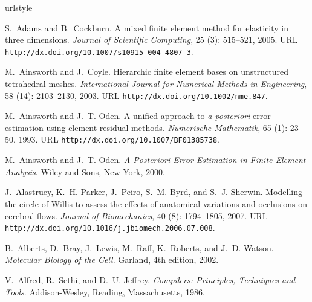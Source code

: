 \begin{thebibliography}{467}
\providecommand{\natexlab}[1]{#1}
\providecommand{\url}[1]{\texttt{#1}}
\expandafter\ifx\csname urlstyle\endcsname\relax
  \providecommand{\doi}[1]{doi: #1}\else
  \providecommand{\doi}{doi: \begingroup \urlstyle{rm}\Url}\fi

S.~Adams and B.~Cockburn.
\newblock A mixed finite element method for elasticity in three dimensions.
\newblock \emph{Journal of Scientific Computing}, 25 (3):
  515--521, 2005.
\newblock URL \url{http://dx.doi.org/10.1007/s10915-004-4807-3}.

M.~Ainsworth and J.~Coyle.
\newblock Hierarchic finite element bases on unstructured tetrahedral meshes.
\newblock \emph{International Journal for Numerical Methods in Engineering},
  58 (14): 2103--2130, 2003.
\newblock URL \url{http://dx.doi.org/10.1002/nme.847}.

M.~Ainsworth and J.~T. Oden.
\newblock A unified approach to \emph{a posteriori} error estimation using
  element residual methods.
\newblock \emph{Numerische Mathematik}, 65 (1): 23--50, 1993.
\newblock URL \url{http://dx.doi.org/10.1007/BF01385738}.

M.~Ainsworth and J.~T. Oden.
\newblock \emph{\emph{A Posteriori} Error Estimation in Finite Element
  Analysis}.
\newblock Wiley and Sons, New York, 2000.

J.~Alastruey, K.~H. Parker, J.~Peiro, S.~M. Byrd, and S.~J. Sherwin.
\newblock Modelling the circle of {W}illis to assess the effects of anatomical
  variations and occlusions on cerebral flows.
\newblock \emph{Journal of Biomechanics}, 40 (8): 1794--1805,
  2007.
\newblock URL \url{http://dx.doi.org/10.1016/j.jbiomech.2006.07.008}.

B.~Alberts, D.~Bray, J.~Lewis, M.~Raff, K.~Roberts, and J.~D. Watson.
\newblock \emph{Molecular Biology of the Cell}.
\newblock Garland, 4th edition, 2002.

V.~Alfred, R.~Sethi, and D.~U. Jeffrey.
\newblock \emph{Compilers: Principles, Techniques and Tools}.
\newblock Addison-Wesley, Reading, Massachusetts, 1986.


\end{thebibliography}
